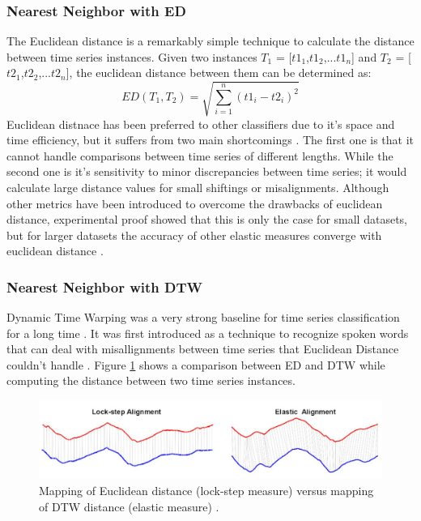\subsubsection{Nearest Neighbor with ED}
The Euclidean distance is a remarkably simple technique to calculate the distance between time series instances.
Given two instances  $T_{1}$ = [$t1_{1}$,$t1_{2}$,...$t1_{n}$]
and $T_{2}$ = [$t2_{1}$,$t2_{2}$,...$t2_{n}$], the euclidean distance
between them can be determined as:
\begin{equation}
    ED(T_{1},T_{2})= \sqrt{\sum_{i=1}^{n} (t1_{i} - t2_{i})^{2}}
\end{equation}
Euclidean distnace has been preferred to other classifiers due to it's space and time efficiency, but it suffers from two main shortcomings \cite{baydogan2013bag, jeong2011weighted,kate2016using}.
The first one is that it cannot handle comparisons between time series of different lengths.
While the second one is it's sensitivity to minor discrepancies between time series; it would calculate large distance values for small shiftings or misalignments.
Although other metrics have been introduced to overcome the drawbacks of euclidean distance,
experimental proof showed that this is only the case for small datasets, but for larger datasets the accuracy of other elastic measures
converge with euclidean distance \cite{hills2014classification,ding2008querying,bagnall2012transformation}.


\subsubsection{Nearest Neighbor with DTW}
\label{SubsubsectionDTW}
Dynamic Time Warping was a very strong baseline for time series classification for a long time \cite{abanda2019review,bagnall2017great}.
It was first introduced as a technique to recognize spoken words that can deal with misallignments between time series
that Euclidean Distance couldn't handle \cite{tan2020fastee}.
Figure \ref{Img:ED_vs_DTW} shows a comparison between ED and DTW while computing the distance between two time series instances.

\begin{figure}[!htbp]
    \captionsetup{justification=raggedright}
    \centering
    \includegraphics[scale = 0.5]{ED_vs_DTW.JPG}
    \centering
    \caption{Mapping of Euclidean distance (lock-step measure) versus mapping of DTW distance (elastic measure) \cite{abanda2019review}.}
    \label{Img:ED_vs_DTW}
\end{figure}

